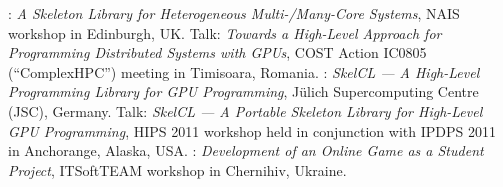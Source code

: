        {: \emph{A Skeleton Library for Heterogeneous
        Multi-/Many-Core Systems}, \small NAIS workshop in Edinburgh, UK.}
       {Talk: \emph{Towards a High-Level Approach for Programming Distributed
        Systems with GPUs}, \small COST Action IC0805 (``ComplexHPC'')
        meeting in Timisoara, Romania.}
       {: \emph{SkelCL --- A High-Level Programming Library for GPU
        Programming}, \small Jülich Supercomputing Centre (JSC), Germany.}
       {Talk: \emph{SkelCL --- A Portable Skeleton Library for High-Level
        GPU Programming},
        \small HIPS 2011 workshop held in conjunction with IPDPS 2011 in
        Anchorange, Alaska, USA.}
       {: \emph{Development of an Online Game as a Student Project},
        \small ITSoftTEAM workshop in Chernihiv, Ukraine.}
